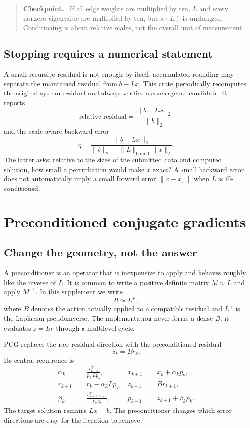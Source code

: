 \documentclass[11pt]{article}
\newenvironment{checkpoint}{\begin{quote}\color{cmgteal}\textbf{Checkpoint.}\ }{\end{quote}}
\begin{document}
\begin{checkpoint}
If all edge weights are multiplied by ten, $L$ and every nonzero eigenvalue are multiplied by ten, but $\kappa(L)$ is unchanged.  Conditioning is about relative scales, not the overall unit of measurement.
\end{checkpoint}

\subsection{Stopping requires a numerical statement}

A small recursive residual is not enough by itself: accumulated rounding may separate the maintained residual from $b-Lx$.  This crate periodically recomputes the original-system residual and always verifies a convergence candidate.  It reports
\[
  \text{relative residual}=\frac{\lVert b-Lx\rVert_2}{\lVert b\rVert_2}
\]
and the scale-aware backward error
\[
  \eta=\frac{\lVert b-Lx\rVert_2}
  {\lVert b\rVert_2+\lVert L\rVert_{\mathrm{bound}}\lVert x\rVert_2}.
  \tag{4}\label{eq:backward}
\]
The latter asks: relative to the sizes of the submitted data and computed solution, how small a perturbation would make $x$ exact?  A small backward error does not automatically imply a small forward error $\lVert x-x_\star\rVert$ when $L$ is ill-conditioned.

\section{Preconditioned conjugate gradients}

\subsection{Change the geometry, not the answer}

A preconditioner is an operator that is inexpensive to apply and behaves roughly like the inverse of $L$.  It is common to write a positive definite matrix $M\approx L$ and apply $M^{-1}$.  In this supplement we write
\[
  B\approx L^+,
\]
where $B$ denotes the action actually applied to a compatible residual and $L^+$ is the Laplacian pseudoinverse.  The implementation never forms a dense $B$; it evaluates $z=Br$ through a multilevel cycle.

PCG replaces the raw residual direction with the preconditioned residual
\[
  z_k=Br_k.
\]
Its central recurrence is
\begin{align*}
  \alpha_k&=\frac{r_k^\top z_k}{p_k^\top Lp_k},
  &x_{k+1}&=x_k+\alpha_kp_k,\\
  r_{k+1}&=r_k-\alpha_kLp_k,
  &z_{k+1}&=Br_{k+1},\\
  \beta_k&=\frac{r_{k+1}^\top z_{k+1}}{r_k^\top z_k},
  &p_{k+1}&=z_{k+1}+\beta_kp_k.
\end{align*}
The target solution remains $Lx=b$.  The preconditioner changes which error directions are easy for the iteration to remove.
\end{document}
